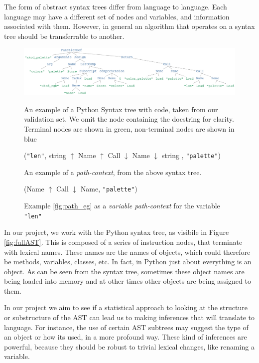 The form of abstract syntax trees differ from language to language. 
Each language may have a different set of nodes and variables, and information associated with them.
However, in general an algorithm that operates on a syntax tree should be transferrable to another. 

\begin{figure}[tb]
    \centering
    \includegraphics[width=\linewidth]{ModelPics/xkcd_palette_strip_full.png}
    \caption{An example of a Python Syntax tree with code, taken from our validation set. We omit the node containing the docstring for clarity. Terminal nodes are shown in green, non-terminal nodes are shown in blue }
    \label{fig:fullAST}

(\texttt{"len"}, string $\uparrow$ Name $\uparrow$ Call $\downarrow$ Name $\downarrow$ string ,  \texttt{"palette"})
    \caption{An example of a \textit{path-context}, from the above syntax tree.}
    \label{fig:path_eg}

    (Name $\uparrow$ Call $\downarrow$ Name,  \texttt{"palette"})
    \caption{Example \ref{fig:path_eg} as a \textit{variable path-context} for the variable \texttt{"len"}}
    \label{fig:varpath_eg}

\end{figure}

In our project, we work with the Python syntax tree, as visibile in Figure \ref{fig:fullAST}.
This is composed of a series of instruction nodes, that terminate with lexical names. 
These names are the names of objects, which could therefore be methods, variables, classes, etc. 
In fact, in Python just about everything is an object. 
As can be seen from the syntax tree, sometimes these object names are being loaded into memory and at other times other objects are being assigned to them.

In our project we aim to see if a statistical approach to looking at the structure or substructure of the AST can lead us to making inferences that will translate to language. 
For instance, the use of certain AST subtrees may suggest the type of an object or how its used, in a more profound way.
These kind of inferences are powerful, because they should be robust to trivial lexical changes, like renaming a variable.

